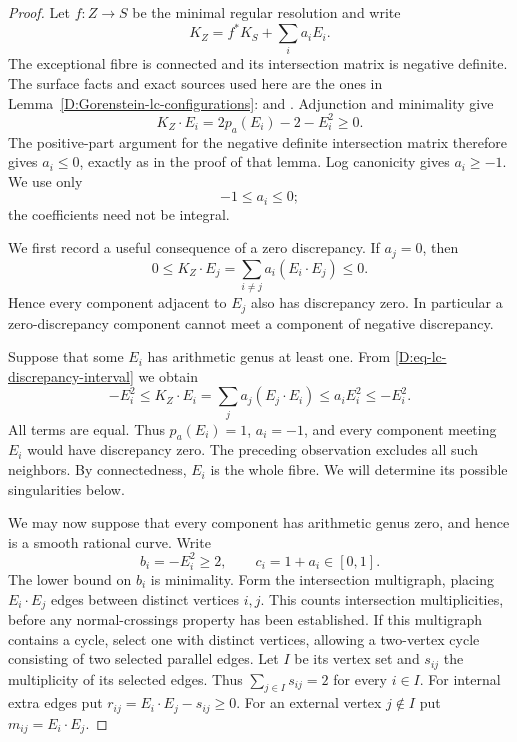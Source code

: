 \begin{proof}
Let $f:Z\to S$ be the minimal regular resolution and write
\[
 K_Z=f^*K_S+\sum_i a_i E_i.
\]
The exceptional fibre is connected and its intersection
matrix is negative definite.  The surface facts and exact
sources used here are the ones in
Lemma~\ref{D:Gorenstein-lc-configurations}:
\cite[section 10.1, Theorem 10.1]{Kollar2013D} and
\cite[tags 0BGP, 0C2M and 0C5R]{StacksDSurfaceResolution}.
Adjunction and minimality give
\[
 K_Z\cdot E_i=2p_a(E_i)-2-E_i^2\geq0.
\]
The positive-part argument for the negative definite
intersection matrix therefore gives $a_i\leq0$, exactly
as in the proof of that lemma.  Log canonicity gives
$a_i\geq-1$.  We use only
\begin{equation}\label{D:eq-lc-discrepancy-interval}
                  -1\leq a_i\leq0;
\end{equation}
the coefficients need not be integral.

We first record a useful consequence of a zero discrepancy.
If $a_j=0$, then
\[
 0\leq K_Z\cdot E_j
    =\sum_{i\ne j}a_i(E_i\cdot E_j)\leq0.
\]
Hence every component adjacent to $E_j$ also has
discrepancy zero.  In particular a zero-discrepancy
component cannot meet a component of negative discrepancy.

Suppose that some $E_i$ has arithmetic genus at least one.
From \eqref{D:eq-lc-discrepancy-interval} we obtain
\[
 -E_i^2\leq K_Z\cdot E_i
       =\sum_j a_j(E_j\cdot E_i)
       \leq a_iE_i^2\leq -E_i^2.
\]
All terms are equal.  Thus $p_a(E_i)=1$, $a_i=-1$,
and every component meeting $E_i$ would have discrepancy
zero.  The preceding observation excludes all such
neighbors.  By connectedness, $E_i$ is the whole fibre.
We will determine its possible singularities below.

We may now suppose that every component has arithmetic
genus zero, and hence is a smooth rational curve.
Write
\[
 b_i=-E_i^2\geq2,\qquad c_i=1+a_i\in[0,1].
\]
The lower bound on $b_i$ is minimality.
Form the intersection multigraph, placing
$E_i\cdot E_j$ edges between distinct vertices $i,j$.
This counts intersection multiplicities, before any
normal-crossings property has been established.
If this multigraph contains a cycle, select one with
distinct vertices, allowing a two-vertex cycle consisting
of two selected parallel edges.
Let $I$ be its vertex set and $s_{ij}$ the multiplicity
of its selected edges.  Thus
$\sum_{j\in I}s_{ij}=2$ for every $i\in I$.
For internal extra edges put
$r_{ij}=E_i\cdot E_j-s_{ij}\geq0$.
For an external vertex $j\notin I$ put
$m_{ij}=E_i\cdot E_j$.


\end{proof}
